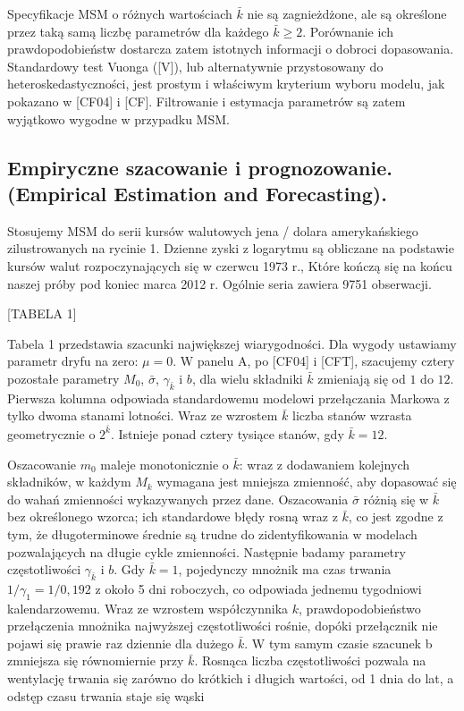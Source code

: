 \documentclass[12pt]{article}
\theoremstyle{definition}
\begin{document}
Specyfikacje MSM o różnych wartościach $\bar{k}$ nie są zagnieżdżone, ale są określone przez taką samą liczbę parametrów dla każdego $\bar{k} \geq 2$. Porównanie ich prawdopodobieństw dostarcza zatem istotnych informacji o dobroci dopasowania. Standardowy test Vuonga ([V]), lub alternatywnie przystosowany do heteroskedastyczności, jest prostym i właściwym kryterium wyboru modelu, jak pokazano w [CF04] i [CF]. Filtrowanie i estymacja parametrów są zatem wyjątkowo wygodne w przypadku MSM.

\subsection{Empiryczne szacowanie i prognozowanie.\\
(Empirical Estimation and Forecasting).}

Stosujemy MSM do serii kursów walutowych jena / dolara amerykańskiego zilustrowanych na rycinie 1. Dzienne zyski z logarytmu są obliczane na podstawie kursów walut rozpoczynających się w czerwcu 1973 r., Które kończą się na końcu naszej próby pod koniec marca 2012 r. Ogólnie seria zawiera 9751 obserwacji.

\begin{center}
[TABELA 1]
\end{center}

Tabela 1 przedstawia szacunki największej wiarygodności. Dla wygody ustawiamy parametr dryfu na zero: $\mu=0$. W panelu A, po [CF04] i [CFT], szacujemy cztery pozostałe parametry $M_0$, $\bar{\sigma}$, $\gamma_{\bar{k}}$ i $b$, dla wielu składniki $\bar{k}$ zmieniają się od $1$ do $12$. Pierwsza kolumna odpowiada standardowemu modelowi przełączania Markowa z tylko dwoma stanami lotności. Wraz ze wzrostem $\bar{k}$ liczba stanów wzrasta geometrycznie o $2^{\bar{k}}$. Istnieje ponad cztery tysiące stanów, gdy $\bar{k}=12$.

Oszacowanie $m_0$ maleje monotonicznie o $\bar{k}$: wraz z dodawaniem kolejnych składników, w każdym $M_k$ wymagana jest mniejsza zmienność, aby dopasować się do wahań zmienności wykazywanych przez dane. Oszacowania $\bar{\sigma}$ różnią się w $\bar{k}$ bez określonego wzorca; ich standardowe błędy rosną wraz z $\bar{k}$, co jest zgodne z tym, że długoterminowe średnie są trudne do zidentyfikowania w modelach pozwalających na długie cykle zmienności. Następnie badamy parametry częstotliwości $\gamma_{\bar{k}}$ i $b$. Gdy $\bar{k}=1$, pojedynczy mnożnik ma czas trwania $1/\gamma_1 = 1/0,192$ z około 5 dni roboczych, co odpowiada jednemu tygodniowi kalendarzowemu. Wraz ze wzrostem współczynnika $k$, prawdopodobieństwo przełączenia mnożnika najwyższej częstotliwości rośnie, dopóki przełącznik nie pojawi się prawie raz dziennie dla dużego $\bar{k}$. W tym samym czasie szacunek b zmniejsza się równomiernie przy $\bar{k}$. Rosnąca liczba częstotliwości pozwala na wentylację trwania się zarówno do krótkich i długich wartości, od 1 dnia do lat, a odstęp czasu trwania staje się wąski
\end{document}
